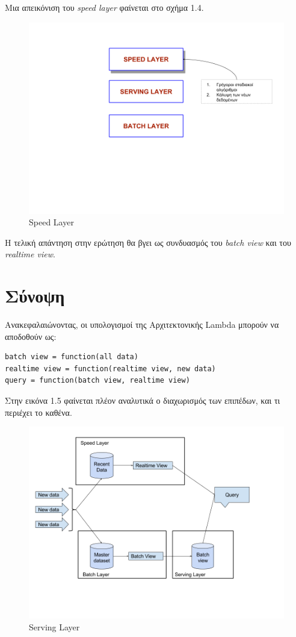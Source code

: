 Μια απεικόνιση του \textit{speed layer} φαίνεται στο σχήμα 1.4.
\begin{figure}[t]
\caption{Speed Layer}
\includegraphics[width=15cm]{images/speed_layer.png}
\centering
\end{figure}
\clearpage

Η τελική απάντηση στην ερώτηση θα βγει ως συνδυασμός του \textit{batch view} και του \textit{realtime view}.

\section{Σύνοψη}
Ανακεφαλαιώνοντας, οι υπολογισμοί της Αρχιτεκτονικής Lambda μπορούν να αποδοθούν ως:
\begin{verbatim}
batch view = function(all data)
realtime view = function(realtime view, new data)
query = function(batch view, realtime view)
\end{verbatim}

Στην εικόνα 1.5 φαίνεται πλέον αναλυτικά ο διαχωρισμός των επιπέδων, και τι περιέχει το καθένα.
\begin{figure}[t]
\caption{Serving Layer}
\includegraphics[width=15cm]{images/lambda.png}
\centering
\end{figure}
\clearpage